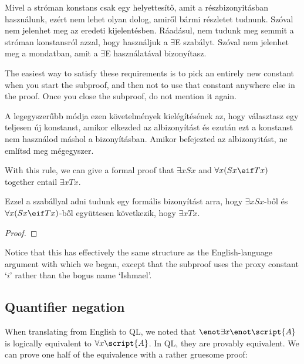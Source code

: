 Mivel a stróman konstans csak egy helyettesítő, amit a részbizonyitásban használunk, ezért nem lehet olyan dolog, amiről bármi részletet tudnunk. Szóval nem jelenhet meg az eredeti kijelentésben. Ráadásul, nem tudunk meg semmit a stróman konstansról azzal, hogy használjuk a $\exists$E szabályt. Szóval nem jelenhet meg a  mondatban, amit a  $\exists$E használatával bizonyítasz.

The easiest way to satisfy these requirements is to pick an entirely new constant when you start the subproof, and then not to use that constant anywhere else in the proof. Once you close the subproof, do not mention it again.

A legegyszerűbb módja ezen követelmények kielégítésének az, hogy választasz egy teljesen új konstanst, amikor elkezded az albizonyítást és ezután ezt a konstanst nem használod máshol a bizonyításban. Amikor befejezted az albizonyitást, ne említsd meg mégegyszer.

With this rule, we can give a formal proof that $\exists x Sx$ and $\forall x(Sx \eif Tx)$ together entail $\exists x Tx$.

Ezzel a szabállyal adni tudunk egy formális bizonyítást arra, hogy $\exists x Sx$-ből és $\forall x(Sx \eif Tx)$-ből együttesen következik, hogy $\exists x Tx$.



\begin{proof}
	\open
		 
	\close
\end{proof}

Notice that this has effectively the same structure as the English-language argument with which we began, except that the subproof uses the proxy constant `$i$' rather than the bogus name `Ishmael'.

\subsection{Quantifier negation}

When translating from English to QL, we noted that $\enot\exists x\enot\script{A}$ is logically equivalent to $\forall x\script{A}$. In QL, they are provably equivalent. We can prove one half of the equivalence with a rather gruesome proof:

